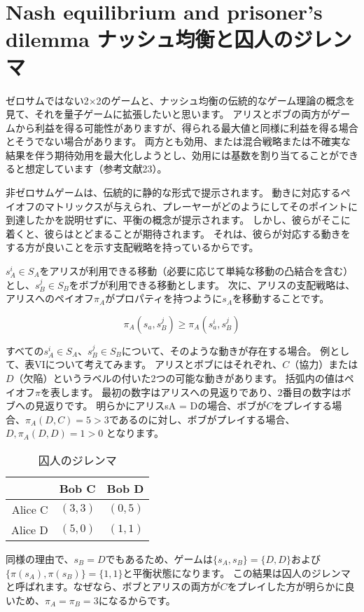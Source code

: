 \section{Nash equilibrium and prisoner’s dilemma ナッシュ均衡と囚人のジレンマ}

ゼロサムではない2×2のゲームと、ナッシュ均衡の伝統的なゲーム理論の概念を見て、それを量子ゲームに拡張したいと思います。 アリスとボブの両方がゲームから利益を得る可能性がありますが、得られる最大値と同様に利益を得る場合とそうでない場合があります。 両方とも効用、または混合戦略または不確実な結果を伴う期待効用を最大化しようとし、効用には基数を割り当てることができると想定しています（参考文献23）。

非ゼロサムゲームは、伝統的に静的な形式で提示されます。 動きに対応するペイオフのマトリックスが与えられ、プレーヤーがどのようにしてそのポイントに到達したかを説明せずに、平衡の概念が提示されます。 しかし、彼らがそこに着くと、彼らはとどまることが期待されます。 それは、彼らが対応する動きをする方が良いことを示す支配戦略を持っているからです。

$s^i_A \in S_A$をアリスが利用できる移動（必要に応じて単純な移動の凸結合を含む）とし、$s_B^j \in S_B$をボブが利用できる移動とします。
次に、アリスの支配戦略は、アリスへのペイオフ$\pi_A$がプロパティを持つように$s_A$を移動することです。

\begin{equation}
\label{116}
\pi_A (s_a, s^j_B ) 
\ge
\pi_A (s^i_a, s^j_B ) 
\end{equation}

すべての$s^i_A \in S_A$、$s_B^j \in S_B$について、そのような動きが存在する場合。 例として、表VIについて考えてみます。 アリスとボブにはそれぞれ、$C$（協力）または$D$（欠陥）というラベルの付いた2つの可能な動きがあります。 括弧内の値はペイオフ$\pi$を表します。 最初の数字はアリスへの見返りであり、2番目の数字はボブへの見返りです。 明らかにアリスsA = Dの場合、ボブが$C$をプレイする場合、$\pi_A (D,C) = 5 > 3$であるのに対し、ボブがプレイする場合、$D, \pi_A(D,D) = 1 > 0$ となります。

\begin{table}[htb]
\caption{囚人のジレンマ}
\centering
\begin{tabular}{|r|r|r|} \hline
 & Bob C & Bob D \\ \hline
Alice C & $(3,3)$ & $(0,5)$ \\
Alice D & $(5,0)$ & $(1,1)$ \\ \hline
\end{tabular}
\end{table} 
同様の理由で、$s_B = D$でもあるため、ゲームは$\{ s_A,s_B \} =  \{ D, D \}$および$ \{ \pi(s_A),\pi(s_B) \} =  \{ 1,1 \}$と平衡状態になります。
この結果は囚人のジレンマと呼ばれます。なぜなら、ボブとアリスの両方が$C$をプレイした方が明らかに良いため、$\pi_A = \pi_B = 3$になるからです。

